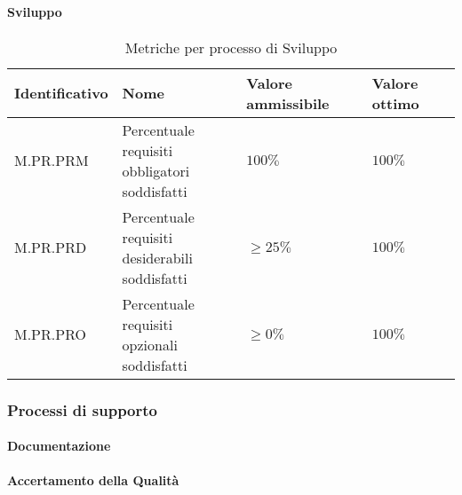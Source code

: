 \paragraph{Sviluppo}
\begin{table}[H]
    \centering
    \begin{tabular}{| l | l | l | l |}
    \hline
    \textbf{Identificativo} & 
    \textbf{Nome} &
    \textbf{Valore ammissibile} &
    \textbf{Valore ottimo}\\
    \hline
        M.PR.PRM & \makecell{Percentuale requisiti \\ obbligatori soddisfatti} & $100\%$ & $100\%$ \\
    \hline
        M.PR.PRD & \makecell{Percentuale requisiti \\ desiderabili soddisfatti} & $\geq 25\%$ & $100\%$ \\
    \hline    
        M.PR.PRO & \makecell{Percentuale requisiti \\ opzionali soddisfatti} & $\geq 0\%$ & $100\%$ \\
    \hline
\end{tabular}
\caption{Metriche per processo di Sviluppo}
\label{tab:metriche_sviluppo} 
\end{table}

\subsubsection{Processi di supporto}
\paragraph{Documentazione}
\begin{table}[H]
    \centering
\caption{Metriche per processo di Documentazione}
\label{tab:metriche_documentazione} 
\end{table}

\paragraph{Accertamento della Qualità}
\begin{table}[H]
    \centering
\caption{Metriche per processo di Accertamento della Qualità}
\label{tab:metriche_accertamento} 
\end{table}

